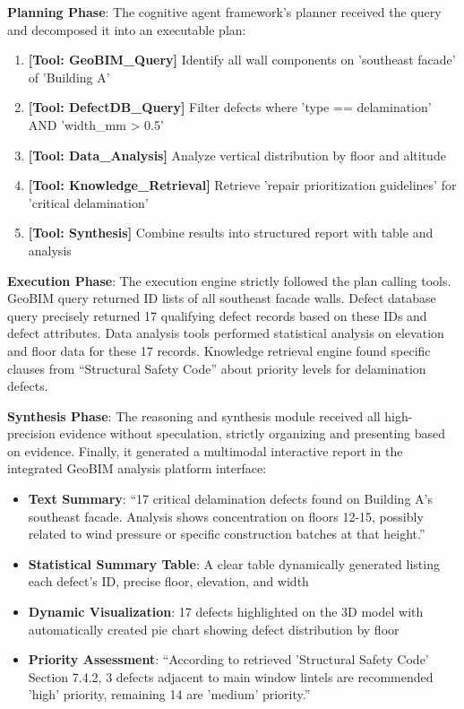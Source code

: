 \textbf{Planning Phase}: The cognitive agent framework's planner received the query and decomposed it into an executable plan:
\begin{enumerate}
\item \textbf{[Tool: GeoBIM\_Query]} Identify all wall components on 'southeast facade' of 'Building A'
\item \textbf{[Tool: DefectDB\_Query]} Filter defects where 'type == delamination' AND 'width\_mm > 0.5'
\item \textbf{[Tool: Data\_Analysis]} Analyze vertical distribution by floor and altitude
\item \textbf{[Tool: Knowledge\_Retrieval]} Retrieve 'repair prioritization guidelines' for 'critical delamination'
\item \textbf{[Tool: Synthesis]} Combine results into structured report with table and analysis
\end{enumerate}

\textbf{Execution Phase}: The execution engine strictly followed the plan calling tools. GeoBIM query returned ID lists of all southeast facade walls. Defect database query precisely returned 17 qualifying defect records based on these IDs and defect attributes. Data analysis tools performed statistical analysis on elevation and floor data for these 17 records. Knowledge retrieval engine found specific clauses from ``Structural Safety Code'' about priority levels for delamination defects.

\textbf{Synthesis Phase}: The reasoning and synthesis module received all high-precision evidence without speculation, strictly organizing and presenting based on evidence. Finally, it generated a multimodal interactive report in the integrated GeoBIM analysis platform interface:

\begin{itemize}
\item \textbf{Text Summary}: ``17 critical delamination defects found on Building A's southeast facade. Analysis shows concentration on floors 12-15, possibly related to wind pressure or specific construction batches at that height.''
\item \textbf{Statistical Summary Table}: A clear table dynamically generated listing each defect's ID, precise floor, elevation, and width
\item \textbf{Dynamic Visualization}: 17 defects highlighted on the 3D model with automatically created pie chart showing defect distribution by floor
\item \textbf{Priority Assessment}: ``According to retrieved 'Structural Safety Code' Section 7.4.2, 3 defects adjacent to main window lintels are recommended 'high' priority, remaining 14 are 'medium' priority.''
\end{itemize}

